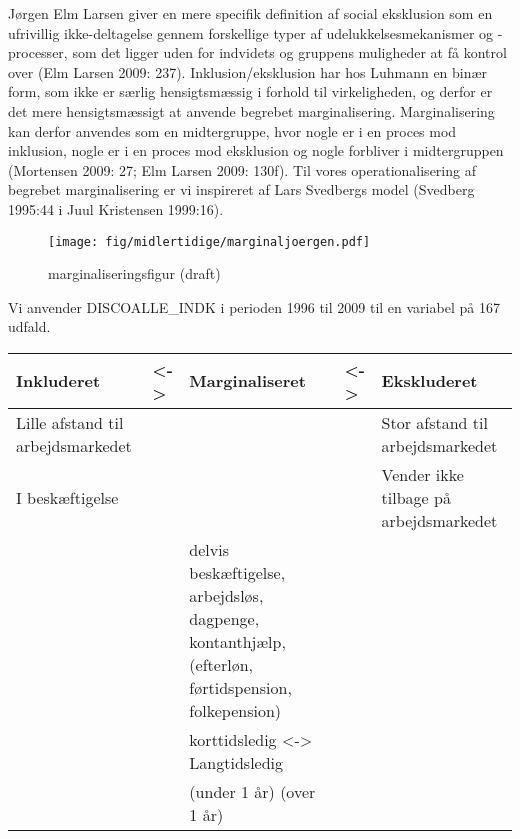 Jørgen Elm Larsen giver en mere specifik definition af social eksklusion som en ufrivillig ikke-deltagelse gennem forskellige typer af udelukkelsesmekanismer og -processer, som det ligger uden for indvidets og gruppens muligheder at få kontrol over (Elm Larsen 2009: 237). Inklusion/eksklusion har hos Luhmann en binær form, som ikke er særlig hensigtsmæssig i forhold til virkeligheden, og derfor er det mere hensigtsmæssigt at anvende begrebet marginalisering. Marginalisering kan derfor anvendes som en midtergruppe, hvor nogle er i en proces mod inklusion, nogle er i en proces mod eksklusion og nogle forbliver i midtergruppen  (Mortensen 2009: 27; Elm Larsen 2009: 130f). Til vores operationalisering af begrebet marginalisering er vi inspireret af Lars Svedbergs model (Svedberg 1995:44 i Juul Kristensen 1999:16).
\begin{figure}[h]
\begin{centering}
	\caption{marginaliseringsfigur (draft)}
  	\texttt{[image: fig/midlertidige/marginaljoergen.pdf]}
  	\label{fig_marginaljoergen}
\end{centering}
\end{figure}
%

Vi anvender DISCOALLE\_INDK i perioden 1996 til 2009 til en variabel på 167 udfald.
\begin{center}
\begin{tabular} { p{3cm} l p{6cm} l p{3cm} } \hline
  Inkluderet & <-> & Marginaliseret & <-> & Ekskluderet \\ \hline
  Lille afstand til arbejdsmarkedet & & & & Stor afstand til arbejdsmarkedet \\ \hline
  I beskæftigelse & & & & Vender ikke tilbage på arbejdsmarkedet \\ \hline
  & & delvis beskæftigelse, arbejdsløs, dagpenge, kontanthjælp, (efterløn, førtidspension, folkepension) & & \\ \hline
  & & korttidsledig <-> Langtidsledig & & \\
  & & (under 1 år)     (over 1 år) & & \\ \hline
\end{tabular}
\end{center}

